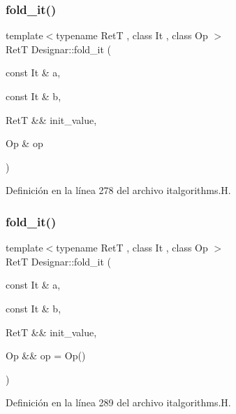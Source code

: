 \subsubsection{\texorpdfstring{fold\+\_\+it()}{fold\_it()}\hspace{0.1cm}{\footnotesize\ttfamily [3/4]}}
{\footnotesize\ttfamily template$<$typename RetT , class It , class Op $>$ \\
RetT Designar\+::fold\+\_\+it (\begin{DoxyParamCaption}\item[{const It \&}]{a,  }\item[{const It \&}]{b,  }\item[{RetT \&\&}]{init\+\_\+value,  }\item[{Op \&}]{op }\end{DoxyParamCaption})}



Definición en la línea 278 del archivo italgorithms.\+H.

\mbox{\label{namespace_designar_a5d9fa528a06abdba905e1c46afc4ae22}} 
\subsubsection{\texorpdfstring{fold\+\_\+it()}{fold\_it()}\hspace{0.1cm}{\footnotesize\ttfamily [4/4]}}
{\footnotesize\ttfamily template$<$typename RetT , class It , class Op $>$ \\
RetT Designar\+::fold\+\_\+it (\begin{DoxyParamCaption}\item[{const It \&}]{a,  }\item[{const It \&}]{b,  }\item[{RetT \&\&}]{init\+\_\+value,  }\item[{Op \&\&}]{op = {\ttfamily Op()} }\end{DoxyParamCaption})}



Definición en la línea 289 del archivo italgorithms.\+H.

\mbox{\label{namespace_designar_a4e4d2731163735de1b313fbd6e888336}} 
